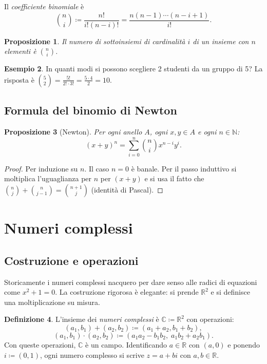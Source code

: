 \documentclass[11pt, a4paper]{book}
\theoremstyle{definition}
\newtheorem{definizione}{Definizione}[section]
\newtheorem{esempio}[definizione]{Esempio}
\theoremstyle{plain}
\newtheorem{proposizione}[definizione]{Proposizione}
\theoremstyle{remark}
\newcommand{\N}{\mathbb{N}}
\newcommand{\R}{\mathbb{R}}
\newcommand{\C}{\mathbb{C}}
\begin{document}
Il \emph{coefficiente binomiale} è
\[
  \binom{n}{i} \coloneqq \frac{n!}{i!(n-i)!} = \frac{n(n-1)\cdots(n-i+1)}{i!}.
\]

\begin{proposizione}
Il numero di sottoinsiemi di cardinalità $i$ di un insieme con $n$ elementi è $\binom{n}{i}$.
\end{proposizione}

\begin{exbox}
\begin{esempio}
In quanti modi si possono scegliere 2 studenti da un gruppo di 5? La risposta è $\binom{5}{2} = \frac{5!}{2! \cdot 3!} = \frac{5 \cdot 4}{2} = 10$.
\end{esempio}
\end{exbox}

\subsection{Formula del binomio di Newton}

\begin{proposizione}[Newton]
Per ogni anello $A$, ogni $x, y \in A$ e ogni $n \in \N$:
\[
  (x + y)^n = \sum_{i=0}^n \binom{n}{i} x^{n-i} y^i.
\]
\end{proposizione}

\begin{proof}
Per induzione su $n$. Il caso $n=0$ è banale. Per il passo induttivo si moltiplica l'uguaglianza per $n$ per $(x+y)$ e si usa il fatto che $\binom{n}{j} + \binom{n}{j-1} = \binom{n+1}{j}$ (identità di Pascal).
\end{proof}

\section{Numeri complessi}
\label{sec:complessi}

\subsection{Costruzione e operazioni}

Storicamente i numeri complessi nacquero per dare senso alle radici di equazioni come $x^2 + 1 = 0$. La costruzione rigorosa è elegante: si prende $\R^2$ e si definisce una moltiplicazione su misura.

\begin{defbox}
\begin{definizione}
L'insieme dei \emph{numeri complessi} è $\C \coloneqq \R^2$ con operazioni:
\[
  (a_1, b_1) + (a_2, b_2) \coloneqq (a_1 + a_2, b_1 + b_2),
\]
\[
  (a_1, b_1) \cdot (a_2, b_2) \coloneqq (a_1 a_2 - b_1 b_2,\; a_1 b_2 + a_2 b_1).
\]
Con queste operazioni, $\C$ è un campo. Identificando $a \in \R$ con $(a, 0)$ e ponendo $i \coloneqq (0, 1)$, ogni numero complesso si scrive $z = a + bi$ con $a, b \in \R$.
\end{definizione}
\end{defbox}
\end{document}
